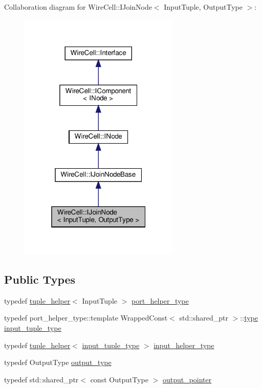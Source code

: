 Collaboration diagram for Wire\+Cell\+:\+:I\+Join\+Node$<$ Input\+Tuple, Output\+Type $>$\+:
\nopagebreak
\begin{figure}[H]
\begin{center}
\leavevmode
\includegraphics[width=217pt]{class_wire_cell_1_1_i_join_node__coll__graph}
\end{center}
\end{figure}
\subsection*{Public Types}
\begin{DoxyCompactItemize}
\item 
typedef \hyperlink{struct_wire_cell_1_1tuple__helper}{tuple\+\_\+helper}$<$ Input\+Tuple $>$ \hyperlink{class_wire_cell_1_1_i_join_node_a7ca2ba39650f70ca5afe7d60ffcb662d}{port\+\_\+helper\+\_\+type}
\item 
typedef port\+\_\+helper\+\_\+type\+::template Wrapped\+Const$<$ std\+::shared\+\_\+ptr $>$\+::\hyperlink{namespace_wire_cell_a1f69a2598e2cdb413ffac1157b50670a}{type} \hyperlink{class_wire_cell_1_1_i_join_node_ae9ca74a75f29555ad20944d585f3b232}{input\+\_\+tuple\+\_\+type}
\item 
typedef \hyperlink{struct_wire_cell_1_1tuple__helper}{tuple\+\_\+helper}$<$ \hyperlink{class_wire_cell_1_1_i_join_node_ae9ca74a75f29555ad20944d585f3b232}{input\+\_\+tuple\+\_\+type} $>$ \hyperlink{class_wire_cell_1_1_i_join_node_ab2bee25205e04b7620344e5fccd27180}{input\+\_\+helper\+\_\+type}
\item 
typedef Output\+Type \hyperlink{class_wire_cell_1_1_i_join_node_a792ae482c431febcce7de37f0ab10d82}{output\+\_\+type}
\item 
typedef std\+::shared\+\_\+ptr$<$ const Output\+Type $>$ \hyperlink{class_wire_cell_1_1_i_join_node_a7af33cc87415e15f0e7db2b083f3def7}{output\+\_\+pointer}
\end{DoxyCompactItemize}
